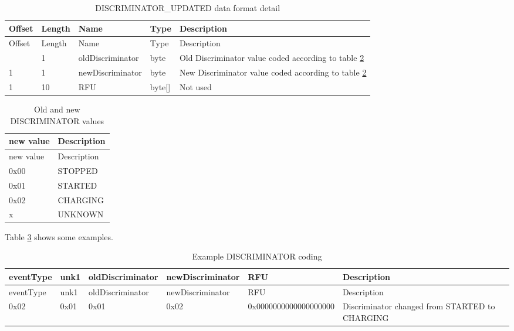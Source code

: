 \documentclass[a4paper]{article}
\begin{document}
\begin{longtable}[]{llllp{7cm}}
	\caption{DISCRIMINATOR\_UPDATED data format detail}
	\label{table.82}
	\tabularnewline
	\toprule\noalign{}
	Offset & Length & Name    & Type     & Description   \\
	\midrule\noalign{}
	\endfirsthead
	\toprule\noalign{}
	Offset & Length & Name      & Type       & Description                                \\
	\midrule\noalign{}
	\endhead
	\bottomrule\noalign{}
	\endlastfoot
	0      & 1      & oldDiscriminator & byte   &  Old Discriminator value  coded according to table \ref{table.83}   \\
	1      & 1      & newDiscriminator & byte   &  New Discriminator value  coded according to table \ref{table.83}  \\
	1      & 10     & RFU      & byte{[}{]} & Not used	\\
\end{longtable}


\begin{longtable}[]{@{}ll@{}}
	\caption{Old and new DISCRIMINATOR values}
	\label{table.83}
	\tabularnewline
	\toprule\noalign{}
	new value & Description    \\
	\midrule\noalign{}
	\endfirsthead
	\toprule\noalign{}
	new value & Description    \\
	\midrule\noalign{}
	\endhead
	\bottomrule\noalign{}
	\endlastfoot
	0x00  &  STOPPED \\
	0x01  &  STARTED \\
	0x02  & CHARGING \\
           x & UNKNOWN\\
\end{longtable}

Table \ref{table.89} shows some examples.

\begin{longtable}[]{lllllp{4cm}}
	\caption{Example DISCRIMINATOR coding}
	\label{table.89}
	\tabularnewline
	\toprule\noalign{}
	eventType & unk1 & oldDiscriminator &  newDiscriminator & RFU                                 & Description      \\
	\midrule\noalign{}
	\endfirsthead
	\toprule\noalign{}
	eventType & unk1 & oldDiscriminator &  newDiscriminator & RFU                                  & Description      \\
	\midrule\noalign{}
	\endhead
	\bottomrule\noalign{}
	\endlastfoot
	0x02 & 0x01 & 0x01 & 0x02 &  \footnotesize 0x0000000000000000000 & Discriminator changed from STARTED to CHARGING    \\
\end{longtable}
\end{document}
